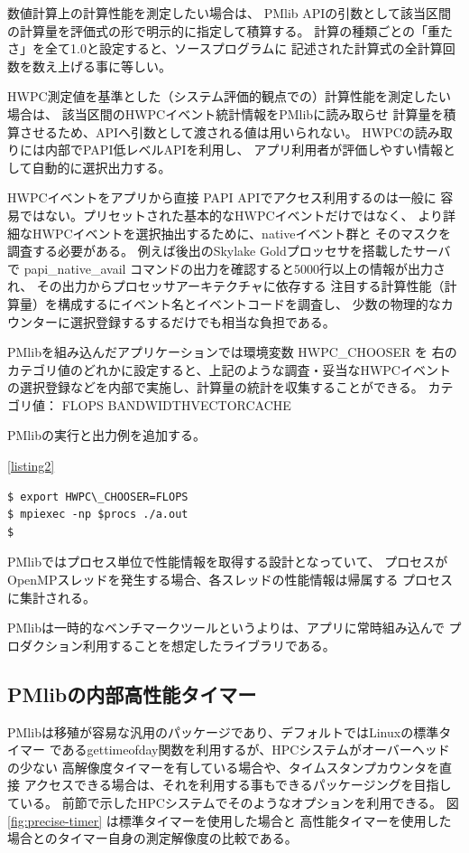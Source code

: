 \documentclass[submit,techrep,noauthor]{ipsj}
\begin{document}
数値計算上の計算性能を測定したい場合は、
PMlib APIの引数として該当区間の計算量を評価式の形で明示的に指定して積算する。
計算の種類ごとの「重たさ」を全て1.0と設定すると、ソースプログラムに
記述された計算式の全計算回数を数え上げる事に等しい。

HWPC測定値を基準とした（システム評価的観点での）計算性能を測定したい場合は、
該当区間のHWPCイベント統計情報をPMlibに読み取らせ
計算量を積算させるため、APIへ引数として渡される値は用いられない。
HWPCの読み取りには内部でPAPI低レベルAPIを利用し、
アプリ利用者が評価しやすい情報として自動的に選択出力する。

HWPCイベントをアプリから直接 PAPI APIでアクセス利用するのは一般に
容易ではない。プリセットされた基本的なHWPCイベントだけではなく、
より詳細なHWPCイベントを選択抽出するために、nativeイベント群と
そのマスクを調査する必要がある。
例えば後出のSkylake Goldプロッセサを搭載したサーバで
papi\_native\_avail コマンドの出力を確認すると5000行以上の情報が出力され、
その出力からプロセッサアーキテクチャに依存する
注目する計算性能（計算量）を構成するにイベント名とイベントコードを調査し、
少数の物理的なカウンターに選択登録するするだけでも相当な負担である。

PMlibを組み込んだアプリケーションでは環境変数 HWPC\_CHOOSER を
右のカテゴリ値のどれかに設定すると、上記のような調査・妥当なHWPCイベント
の選択登録などを内部で実施し、計算量の統計を収集することができる。
カテゴリ値：
FLOPS \textbar BANDWIDTH\textbar VECTOR\textbar CACHE

{ \color{blue} \par
PMlibの実行と出力例を追加する。 \par
\lstlistingname \ref{listing2}
\begin{lstlisting}[caption={\hfill},label={listing2},captionpos=t]
$ export HWPC\_CHOOSER=FLOPS
$ mpiexec -np $procs ./a.out
$
\end{lstlisting}
} \par

PMlibではプロセス単位で性能情報を取得する設計となっていて、
プロセスがOpenMPスレッドを発生する場合、各スレッドの性能情報は帰属する
プロセスに集計される。

PMlibは一時的なベンチマークツールというよりは、アプリに常時組み込んで
プロダクション利用することを想定したライブラリである。

\subsection{PMlibの内部高性能タイマー}
PMlibは移殖が容易な汎用のパッケージであり、デフォルトではLinuxの標準タイマー
であるgettimeofday関数を利用するが、HPCシステムがオーバーヘッドの少ない
高解像度タイマーを有している場合や、タイムスタンプカウンタを直接
アクセスできる場合は、それを利用する事もできるパッケージングを目指している。
前節で示したHPCシステムでそのようなオプションを利用できる。
図\ref{fig:precise-timer} は標準タイマーを使用した場合と
高性能タイマーを使用した場合とのタイマー自身の測定解像度の比較である。
\end{document}
